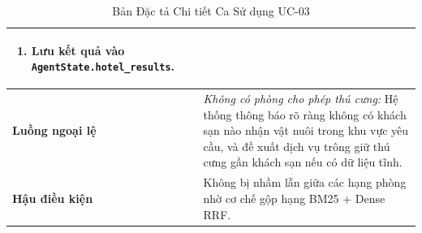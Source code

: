 \begin{table}[h!]
\begin{tabular}{|p{3.2cm}|p{11.5cm}|}
\begin{enumerate}
    \item Lưu kết quả vào \texttt{AgentState.hotel\_results}.
\end{enumerate} \\
\hline
\textbf{Luồng ngoại lệ} & 
\textit{Không có phòng cho phép thú cưng:} Hệ thống thông báo rõ ràng không có khách sạn nào nhận vật nuôi trong khu vực yêu cầu, và đề xuất dịch vụ trông giữ thú cưng gần khách sạn nếu có dữ liệu tĩnh. \\
\hline
\textbf{Hậu điều kiện} & Không bị nhầm lẫn giữa các hạng phòng nhờ cơ chế gộp hạng BM25 + Dense RRF. \\
\hline
\end{tabular}
\caption{Bản Đặc tả Chi tiết Ca Sử dụng UC-03}
\label{tab:spec_uc03}
\end{table}
